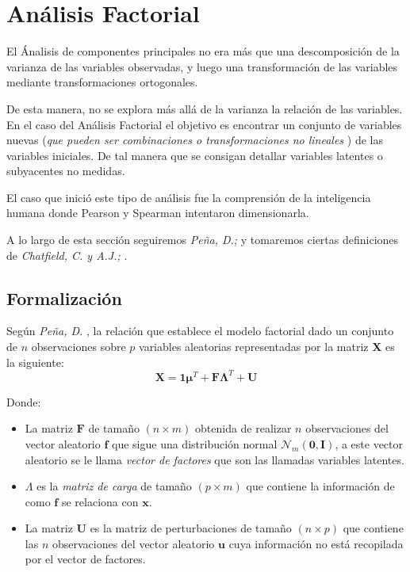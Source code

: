 \section{Análisis Factorial}
\noindent El Ánalisis de componentes principales no era más que una descomposición de la varianza de las variables observadas, y luego una transformación de las variables mediante transformaciones ortogonales. 

\noindent De esta manera, no se explora más allá de la varianza la relación de las variables. En el caso del Análisis Factorial el objetivo es encontrar un conjunto de variables nuevas (\emph{que pueden ser combinaciones o transformaciones no lineales }) de las variables iniciales. De tal manera que se consigan detallar variables latentes o subyacentes no medidas. 

\noindent El caso que inició este tipo de análisis fue la comprensión de la inteligencia humana donde Pearson y Spearman intentaron dimensionarla. 

\noindent A lo largo de esta sección seguiremos \emph{Peña, D.;}\cite{Peña 2002} y tomaremos ciertas definiciones de \emph{Chatfield, C. y A.J.;} \cite{Chatfield 1989}. 

\subsection{Formalización}
\noindent Según \emph{Peña, D.} \cite{Peña 2002}, la relación que establece el modelo factorial dado un conjunto de $n$ observaciones sobre $p$ variables aleatorias representadas por la matriz \textbf{X} es la siguiente:
\begin{equation}\label{Eq. Factorial}
\textbf{X}=\textbf{1}\mathbf{\mu}^T+\textbf{F}\mathbf{\Lambda}^T+\textbf{U}
\end{equation}

\noindent Donde:
\begin{itemize}

\item La matriz $\textbf{F}$ de tamaño $(n\times m)$ obtenida de realizar $n$ observaciones del vector aleatorio $\textbf{f}$ que sigue una distribución normal $\mathcal{N}_m(\mathbf{0},\textbf{I})$, a este vector aleatorio se le llama \emph{vector de factores} que son las llamadas variables latentes.  
\item $\Lambda$ es la \emph{matriz de carga} de tamaño $(p\times m)$ que contiene la información de como $\textbf{f}$ se relaciona con $\textbf{x}$.
\item La matriz $\textbf{U}$ es la matriz de perturbaciones de tamaño $(n\times p )$ que contiene las $n$ observaciones del vector aleatorio $\textbf{u}$ cuya información no está recopilada por el vector de factores. 
\end{itemize}

